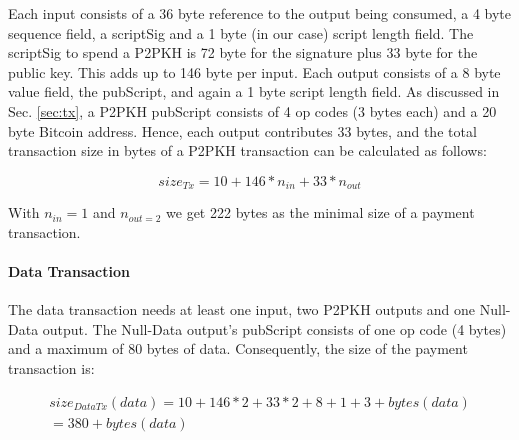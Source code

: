 \begin{table}
\caption{Data fields of a Bitcoin transaction and their sizes.}
\label{tbl:datasize}
\end{table}

Each input consists of a 36 byte reference to the output being consumed, a 4 byte sequence field, a scriptSig and a 1 byte (in our case) script length field. The scriptSig to spend a \ac{P2PKH} is 72 byte for the signature plus 33 byte for the public key. This adds up to 146 byte per input. Each output consists of a 8 byte value field, the pubScript, and again a 1 byte script length field. As discussed in Sec. \ref{sec:tx}, a \ac{P2PKH} pubScript consists of 4 op codes (3 bytes each) and a 20 byte Bitcoin address. Hence, each output contributes 33 bytes, and the total transaction size in bytes of a \ac{P2PKH} transaction can be calculated as follows:

\begin{equation*}
size_{Tx} = 10+146*n_{in}+33*n_{out}
\end{equation*}

With $n_{in}=1$ and $n_{out=2}$ we get 222 bytes as the minimal size of a payment transaction.

\paragraph{Data Transaction}
The data transaction needs at least one input, two \ac{P2PKH} outputs and one Null-Data output. The Null-Data output's pubScript consists of one op code (4 bytes) and a maximum of 80 bytes of data. Consequently, the size of the payment transaction is:

\begin{equation*}
\begin{split}
size_{DataTx}(data) = 10+146*2+33*2+8+1+3+bytes(data) \\ 
= 380+bytes(data)
\end{split}
\end{equation*}

